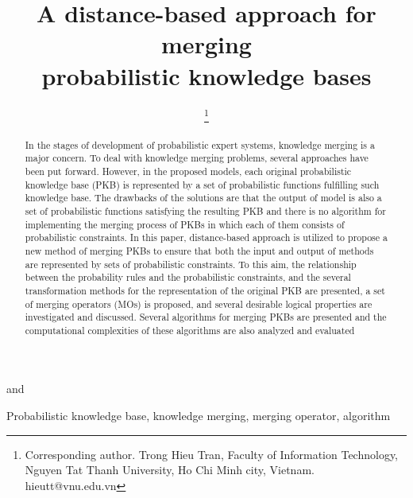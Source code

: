 \documentclass[10pt,a4paper]{IOS-Book-Article}
\begin{document}
\begin{frontmatter}              %


\title{A distance-based approach for merging\\
probabilistic knowledge bases}


\author[A,C]{ }
\author[B,D]{ }
and
\author[A]{ %
\thanks{Corresponding author. Trong Hieu Tran, Faculty of Information Technology, Nguyen Tat Thanh University, Ho Chi Minh city, Vietnam. hieutt@vnu.edu.vn}}


\address[A]{University of Engineering and Technology, Vietnam National University, Hanoi, Vietnam}
\address[B]{Faculty of Computer Science and Management, Wroclaw University of Science and Technology, Poland}
\address[C]{Faculty of Information Technology, Namdinh University of Technology Education, Vietnam}
\address[D]{Faculty of Information Technology, Nguyen Tat Thanh University, Ho Chi Minh city, Vietnam}



\begin{abstract}
In the stages of development of probabilistic expert systems, knowledge merging is a major concern. To deal with knowledge merging problems, several approaches have been put forward. However, in the proposed models, each original probabilistic knowledge base (PKB) is represented by a set of probabilistic functions fulfilling such knowledge base. The drawbacks of the solutions are that the output of model is also a set of probabilistic functions satisfying the resulting PKB and there is no algorithm for implementing the merging process of PKBs in which each of them consists of probabilistic constraints. In this paper, distance-based approach is utilized to propose a new method of merging PKBs to ensure that both the input and output of methods are represented by sets of probabilistic constraints. To this aim, the relationship between the probability rules and the probabilistic constraints, and the several transformation methods for the representation of the original PKB are presented, a set of merging operators (MOs) is proposed, and several desirable logical properties are investigated and discussed. Several algorithms for merging PKBs are presented and the computational complexities of these algorithms are also analyzed and evaluated

\end{abstract}

\begin{keyword}
Probabilistic knowledge base, knowledge merging, merging operator, algorithm
\end{keyword}
\end{frontmatter}
\end{document}
